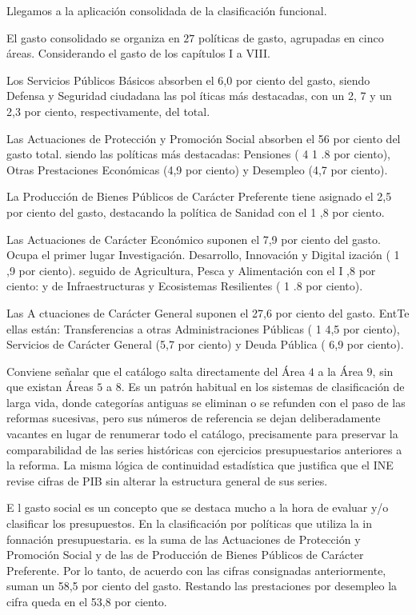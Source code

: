 \documentclass[10pt,a4paper]{article}
\begin{document}
Llegamos a la aplicación consolidada de la clasificación funcional. 

El gasto consolidado se organiza en $27$ políticas de gasto, agrupadas en cinco áreas. Considerando el gasto de los capítulos I a VIII. 

Los Servicios Públicos Básicos absorben el 6,0 por ciento del gasto, siendo Defensa y Seguridad ciudadana las pol íticas más destacadas, con un 2, 7 y un 2,3 por ciento, respectivamente, del total.

Las Actuaciones de Protección y Promoción Social absorben el 56 por ciento del gasto total. siendo las políticas más destacadas: Pensiones ( 4 1 .8 por ciento), Otras Prestaciones Económicas (4,9 por ciento) y Desempleo (4,7 por ciento).

La Producción de Bienes Públicos de Carácter Preferente tiene asignado el 2,5 por ciento del gasto, destacando la política de Sanidad con el 1 ,8  por ciento.

Las Actuaciones de Carácter Económico suponen el 7,9 por ciento del gasto. Ocupa el primer lugar Investigación. Desarrollo, Innovación y Digital ización ( 1 ,9 por ciento). seguido de Agricultura, Pesca y Alimentación con el I ,8 por ciento: y de Infraestructuras y Ecosistemas Resilientes ( 1 .8 por ciento).

Las A ctuaciones de Carácter General suponen el 27,6 por ciento del gasto. EntTe ellas están: Transferencias a otras Administraciones Públicas ( 1 4,5 por ciento), Servicios de Carácter General (5,7 por ciento) y Deuda Pública ( 6,9 por ciento).

Conviene señalar que el catálogo salta directamente del Área $4$ a la Área $9$, sin que existan Áreas $5$ a $8$. Es un patrón habitual en los sistemas de clasificación de larga vida, donde categorías antiguas se eliminan o se refunden con el paso de las reformas sucesivas, pero sus números de referencia se dejan deliberadamente vacantes en lugar de renumerar todo el catálogo, precisamente para preservar la comparabilidad de las series históricas con ejercicios presupuestarios anteriores a la reforma. La misma lógica de continuidad estadística que justifica que el INE revise cifras de PIB sin alterar la estructura general de sus series.


E l gasto social es un concepto que se destaca mucho a la hora de evaluar y/o clasificar los presupuestos. En la clasificación por políticas que utiliza la in fonnación presupuestaria. es la suma de las Actuaciones de Protección y Promoción Social y de las de Producción de Bienes Públicos de Carácter Preferente. Por lo tanto, de acuerdo con las cifras consignadas anteriormente, suman un 58,5 por ciento del gasto. Restando las prestaciones por desempleo la cifra queda en el 53,8 por ciento.
\end{document}
